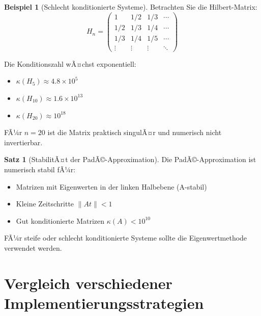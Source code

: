﻿\documentclass[a4paper,12pt]{report}
\theoremstyle{definition}
\newtheorem{beispiel}{Beispiel}
\newtheorem{satz}{Satz}
\begin{document}
	\begin{beispiel}[Schlecht konditionierte Systeme]
		Betrachten Sie die Hilbert-Matrix:
		\[
		H_n = \begin{pmatrix}
			1 & 1/2 & 1/3 & \cdots \\
			1/2 & 1/3 & 1/4 & \cdots \\
			1/3 & 1/4 & 1/5 & \cdots \\
			\vdots & \vdots & \vdots & \ddots
		\end{pmatrix}
		\]
		
		Die Konditionszahl wÃ¤chst exponentiell:
		\begin{itemize}
			\item $\kappa(H_5) \approx 4.8 \times 10^5$
			\item $\kappa(H_{10}) \approx 1.6 \times 10^{13}$
			\item $\kappa(H_{20}) \approx 10^{18}$
		\end{itemize}
		
		FÃ¼r $n = 20$ ist die Matrix praktisch singulÃ¤r und numerisch nicht invertierbar.
	\end{beispiel}
	
	\begin{satz}[StabilitÃ¤t der PadÃ©-Approximation]
		Die PadÃ©-Approximation ist numerisch stabil fÃ¼r:
		\begin{itemize}
			\item Matrizen mit Eigenwerten in der linken Halbebene (A-stabil)
			\item Kleine Zeitschritte $\|At\| < 1$
			\item Gut konditionierte Matrizen $\kappa(A) < 10^{10}$
		\end{itemize}
		
		FÃ¼r steife oder schlecht konditionierte Systeme sollte die Eigenwertmethode verwendet werden.
	\end{satz}
	
	\section{Vergleich verschiedener Implementierungsstrategien}
	
\end{document}
